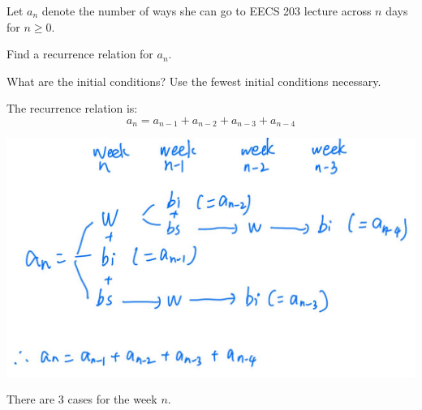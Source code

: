 \documentclass[12pt]{exam}
\begin{document}
Let $a_n$ denote the number of ways she can go to EECS 203 lecture across $n$ days for $n \geq 0$.
\begin{qparts}
    \item Find a recurrence relation for $a_n$.
    \item What are the initial conditions? Use the fewest initial conditions necessary.
\end{qparts}

\begin{solution}
    \begin{qparts}
        \item The recurrence relation is:
            $$
            a_n = a_{n-1} + a_{n-2} + a_{n-3} + a_{n-4}
            $$
            \begin{center}
                \includegraphics[scale=0.2]{4.jpg}
            \end{center}

            There are 3 cases for the week $n$.\\


\end{qparts}
\end{solution}
\end{document}
